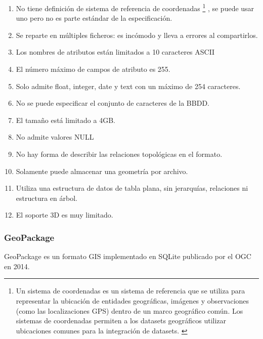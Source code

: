 \begin{enumerate} 
    \item No tiene definición de sistema de referencia de coordenadas \footnote{Un sistema de
            coordenadas es un sistema de referencia que se utiliza para representar la ubicación de entidades
            geográficas, imágenes y observaciones (como las localizaciones GPS) dentro de un marco geográfico
            común. Los sistemas de coordenadas permiten a los datasets geográficos utilizar ubicaciones comunes
            para la integración de datasets. \cite{coordenadas}} 
        , se puede usar uno pero no es parte estándar de la especificación.     
    \item Se reparte en múltiples ficheros: es incómodo y lleva a errores al compartirlos.
    \item Los nombres de atributos están limitados a 10 caracteres ASCII 
    \item El número máximo de campos de atributo es 255.  
    \item Solo admite float, integer, date y text con un máximo de 254 caracteres.  
    \item No se puede especificar el conjunto de caracteres de la BBDD.  
    \item El tamaño está limitado a 4GB.  
    \item No admite valores NULL 
    \item No hay forma de describir las relaciones topológicas en el formato.  
    \item Solamente puede almacenar una geometría por archivo.  
    \item Utiliza una estructura de datos de tabla plana, sin jerarquías, relaciones ni estructura en árbol.  
    \item El soporte 3D es muy limitado.  
\end{enumerate}

\subsubsection{GeoPackage}
GeoPackage es un formato GIS implementado en SQLite publicado por el OGC en 2014. \cite{geopackage-spec}
    
